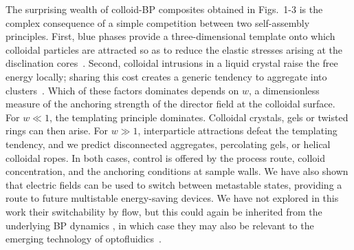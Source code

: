 \documentclass[12pt]{article}
\begin{document}
The surprising wealth of colloid-BP composites obtained in Figs.~1-3 is the complex consequence of a simple competition between two self-assembly principles. 
First, blue phases provide a three-dimensional template onto which colloidal particles are attracted so as to reduce the elastic stresses arising at the disclination cores~\cite{miha}. Second, colloidal intrusions in a liquid crystal raise the free energy locally; sharing this cost creates a generic tendency to aggregate into clusters~\cite{tiffany}. Which of these factors dominates depends on $w$, a dimensionless measure of the anchoring strength of the director field at the colloidal surface. For $w\ll 1$, the templating principle dominates. Colloidal crystals, gels or twisted rings can then arise. For $w \gg 1$, interparticle attractions defeat the templating tendency, and we predict disconnected aggregates, percolating gels, or helical colloidal ropes. In both cases, control is offered by the process route, colloid concentration, and the anchoring conditions at sample walls. We have also shown that electric fields can be used to switch between metastable states, providing a route to future multistable energy-saving devices. 
We have not explored in this work their switchability by flow, but this could again be inherited from the underlying BP dynamics \cite{permeation2,adriano}, in which case they may also be relevant to the emerging technology of optofluidics~\cite{optofluidics}.
\end{document}
